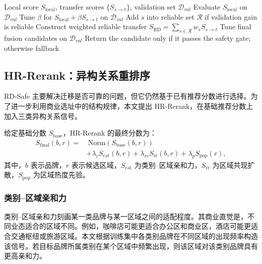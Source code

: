 \documentclass[10pt,twocolumn]{ctexart}
\begin{document}
\begin{algorithm}[H]
\caption{RD-Safe 可靠性感知安全迁移}
\label{alg:rdsafe}
\begin{algorithmic}[1]
\REQUIRE Local score $S_{\mathrm{local}}$, transfer scores $\{S_{s\rightarrow t}\}$, validation set $\mathcal{D}_{val}$
\STATE Evaluate $S_{\mathrm{local}}$ on $\mathcal{D}_{val}$
    \STATE Tune $\beta$ for $S_{\mathrm{local}}+\beta S_{s\rightarrow t}$ on $\mathcal{D}_{val}$
    \STATE Add $s$ into reliable set $\mathcal{R}$ if validation gain is reliable
\ENDFOR
\STATE Construct weighted reliable transfer $S_{\mathrm{RD}}=\sum_{s\in\mathcal{R}}w_sS_{s\rightarrow t}$
\STATE Tune final fusion candidates on $\mathcal{D}_{val}$
\STATE Return the candidate only if it passes the safety gate; otherwise fallback
\end{algorithmic}
\end{algorithm}

\subsection{HR-Rerank：异构关系重排序}

RD-Safe 主要解决迁移是否可靠的问题，但它仍然基于已有推荐分数进行选择。为了进一步利用商业选址中的结构规律，本文提出 HR-Rerank，在基础推荐分数上加入三类异构关系信号。

给定基础分数 $S_{\mathrm{base}}$，HR-Rerank 的最终分数为：
\begin{equation}
\begin{split}
S_{\mathrm{final}}(b,r)
=
&~\mathrm{Norm}(S_{\mathrm{base}}(b,r)) \\
&+ \lambda_c S_{\mathrm{cat}}(b,r)
+ \lambda_{rr}S_{\mathrm{rr}}(b,r)
+ \lambda_p S_{\mathrm{pop}}(r),
\end{split}
\end{equation}
其中，$b$ 表示品牌，$r$ 表示候选区域，$S_{\mathrm{cat}}$ 为类别--区域亲和力，$S_{\mathrm{rr}}$ 为区域共现扩散，$S_{\mathrm{pop}}$ 为区域热度先验。

\subsubsection{类别--区域亲和力}

类别--区域亲和力刻画某一类品牌与某一区域之间的适配程度。其商业直觉是，不同业态适合的区域不同。例如，咖啡店可能更适合办公区和商业区，酒店可能更适合交通枢纽或旅游区域。本文根据训练集中各类别品牌在不同区域的出现频率构造该信号。若目标品牌所属类别在某个区域中频繁出现，则该区域对该类别品牌具有更高亲和力。
\end{document}
